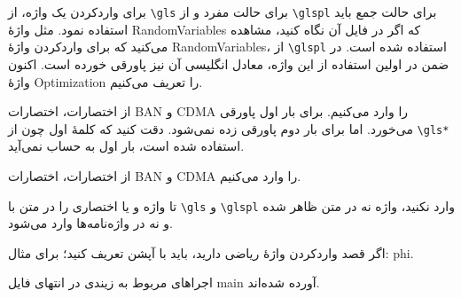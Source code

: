 \documentclass{report}
\begin{document}
برای واردکردن یک واژه، از
\verb+\gls+
برای حالت مفرد و از
\verb+\glspl+
برای حالت جمع باید استفاده نمود. مثل واژهٔ
\glspl{RandomVariable}
که اگر در فایل
\lr{\TeX}
آن نگاه کنید، مشاهده می‌کنید که برای واردکردن واژهٔ
\glspl{RandomVariable}،
از
\verb+\glspl+
استفاده شده است. در ضمن در اولین استفاده از این واژه، معادل انگلیسی آن نیز پاورقی خورده است. اکنون واژهٔ
\gls{Optimization}
را تعریف می‌کنیم. 

از اختصارات، اختصارات
\gls*{BAN} و \gls{CDMA}
را وارد می‌کنیم. برای بار اول پاورقی می‌خورد. اما برای بار دوم پاورقی زده نمی‌شود. دقت کنید که کلمهٔ اول چون از
\verb+\gls*+
استفاده شده است، بار اول به حساب نمی‌آید. 

از اختصارات، اختصارات
\gls{BAN} و \gls{CDMA}
را وارد می‌کنیم. 

تا واژه و یا اختصاری را در متن با
\verb+\gls+ و \verb+\glspl+
وارد نکنید، واژه نه در متن ظاهر شده و نه در واژه‌نامه‌ها وارد می‌شود.

اگر قصد واردکردن واژه‌ٔ ریاضی دارید، باید با آپشن
\LR{\verb+[sort=fullName]+}
تعریف کنید؛ برای مثال:
\gls{phi}.

اجراهای مربوط به زیندی در انتهای فایل main آورده شده‌اند.

\printglossary
\printabbreviation
\end{document}
